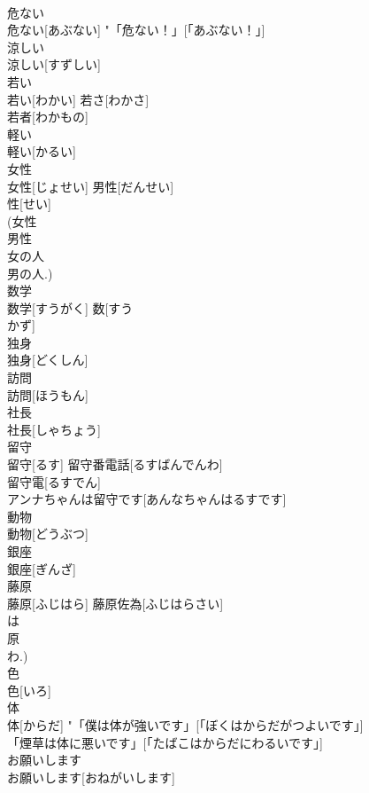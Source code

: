 \documentclass[8pt]{extreport}
\begin{document}
\begin{CJK}{UTF8}{min}
\\	危ない	
\\	危ない[あぶない]	"「危ない！」[「あぶない！」] 
\\	涼しい	
\\	涼しい[すずしい]	
\\	若い	
\\	若い[わかい]	若さ[わかさ] 
\\	若者[わかもの] 
\\	軽い	
\\	軽い[かるい]	
\\	女性	
\\	女性[じょせい]	男性[だんせい] 
\\	性[せい] 
\\	(女性 
\\	男性 
\\	女の人 
\\	男の人.)
\\	数学	
\\	数学[すうがく]	数[すう 
\\	かず] 
\\	独身	
\\	独身[どくしん]	
\\	訪問	
\\	訪問[ほうもん]	
\\	社長	
\\	社長[しゃちょう]	
\\	留守	
\\	留守[るす]	留守番電話[るすばんでんわ] 
\\	留守電[るすでん] 
\\	アンナちゃんは留守です[あんなちゃんはるすです] 
\\	動物	
\\	動物[どうぶつ]	
\\	銀座	
\\	銀座[ぎんざ]	
\\	藤原	
\\	藤原[ふじはら]	藤原佐為[ふじはらさい] 
\\	は 
\\	原 
\\	わ.)
\\	色	
\\	色[いろ]	
\\	体	
\\	体[からだ]	"「僕は体が強いです」[「ぼくはからだがつよいです」] 
\\	「煙草は体に悪いです」[「たばこはからだにわるいです」] 
\\	お願いします	
\\	お願いします[おねがいします]	

\end{CJK}
\end{document}
